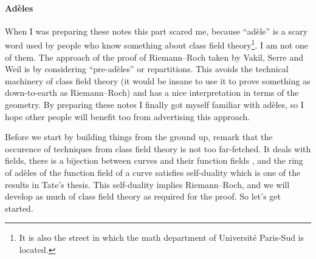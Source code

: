 \documentclass[10pt,a4paper]{article}
\theoremstyle{lecture}
\begin{document}
\paragraph{Ad\`eles}
When I was preparing these notes this part scared me, because ``ad\`ele'' is a scary word used by people who know something about class field theory\footnote{It is also the street in which the math department of Universit\'e Paris-Sud is located.}. I am not one of them. The approach of the proof of Riemann--Roch taken by Vakil, Serre and Weil is by considering ``pre-ad\`eles'' or repartitions. This avoids the technical machinery of class field theory (it would be insane to use it to prove something as down-to-earth as Riemann--Roch) and has a nice interpretation in terms of the geometry. By preparing these notes I finally got myself familiar with ad\`eles, so I hope other people will benefit too from advertising this approach.

Before we start by building things from the ground up, remark that the occurence of techniques from class field theory is not too far-fetched. It deals with fields, there is a bijection between curves and their function fields \cite[\S I.6]{hartshorne-algebraic-geometry}, and the ring of ad\`eles of the function field of a curve satisfies self-duality which is one of the results in Tate's thesis. This self-duality implies Riemann--Roch, and we will develop as much of class field theory as required for the proof. So let's get started.
\end{document}
